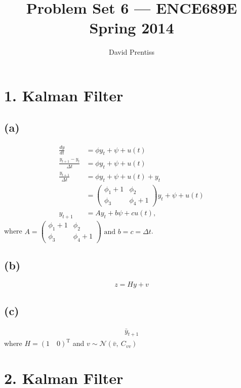 \documentclass[fleqn, letterpaper]{tufte-handout}
\title{Problem Set 6 --- ENCE689E Spring 2014}
\author{David Prentiss}
\newcommand{\T}{^\text{T}}
\begin{document}
\maketitle

\section{1. Kalman Filter}
\subsection{(a)}
\begin{align*}
        \frac{dy}{dt} &= \phi y_t + \psi + u(t) \\
        \frac{y_{t+1}-y_t}{\Delta t} &= \phi y_t + \psi + u(t) \\
        \frac{y_{t+1}}{\Delta t} &= \phi y_t + \psi + u(t) + y_t\\
                                 &= \begin{pmatrix} \phi_1+1 & \phi_2 \\ \phi_3 &\phi_4+1\end{pmatrix} y_t + \psi + u(t)\\
        y_{t+1} &= Ay_t + b\psi + cu(t),
\end{align*}
where $A = \begin{pmatrix} \phi_1+1 & \phi_2 \\ \phi_3 &\phi_4+1\end{pmatrix}\text{ and } b = c = \Delta t
$.

\subsection{(b)}
\[z = Hy + v\]

\subsection{(c)}
\begin{align*}
        \bar{y}_{t+1}
\end{align*}
where $ H = (1\quad 0)\T $ and $v\sim\mathcal{N}(\bar{v},\ C_{vv})$

\section{2. Kalman Filter}

{\scriptsize
        \begin{minipage}{\linewidth}
                
        \end{minipage}
}
\end{document}

